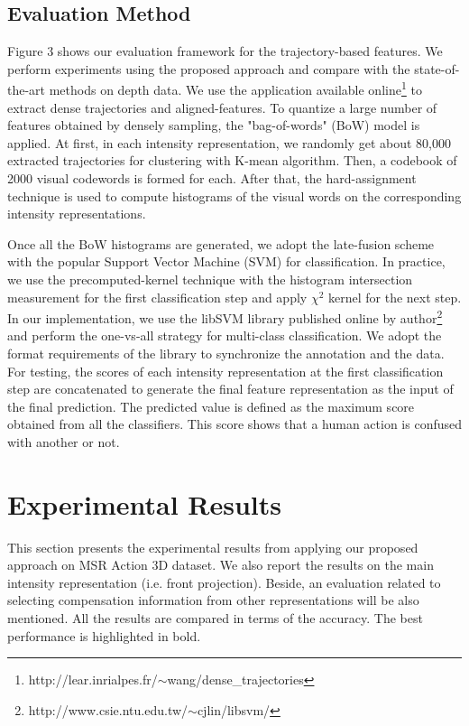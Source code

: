 \documentclass[review]{elsarticle}
\begin{document}
\subsection{Evaluation Method}

Figure 3 shows our evaluation framework for the trajectory-based features. We perform experiments using the proposed approach and compare with the state-of-the-art methods on depth data. We use the application available online\footnote{http://lear.inrialpes.fr/$\sim$wang/dense\_trajectories} to extract dense trajectories and aligned-features. To quantize a large number of features obtained by densely sampling, the "bag-of-words" (BoW) model is applied. At first, in each intensity representation, we randomly get about 80,000 extracted trajectories for clustering with K-mean algorithm. Then, a codebook of 2000 visual codewords is formed for each. After that, the hard-assignment technique is used to compute histograms of the visual words on the corresponding intensity representations.

Once all the BoW histograms are generated, we adopt the late-fusion scheme with the popular Support Vector Machine (SVM) for classification. In practice, we use the precomputed-kernel technique with the histogram intersection measurement for the first classification step and apply $\chi^2$ kernel for the next step. In our implementation, we use the libSVM library published online by author\footnote{http://www.csie.ntu.edu.tw/$\sim$cjlin/libsvm/} and perform the one-vs-all strategy for multi-class classification. We adopt the format requirements of the library to synchronize the annotation and the data. For testing, the scores of each intensity representation at the first classification step are concatenated to generate the final feature representation as the input of the final prediction. The predicted value is defined as the maximum score obtained from all the classifiers. This score shows that a human action is confused with another or not.

\section{Experimental Results}

This section presents the experimental results from applying our proposed approach on MSR Action 3D dataset. We also report the results on the main intensity representation (i.e. front projection). Beside, an evaluation related to selecting compensation information from other representations will be also mentioned. All the results are compared in terms of the accuracy. The best performance is highlighted in bold.
\end{document}
